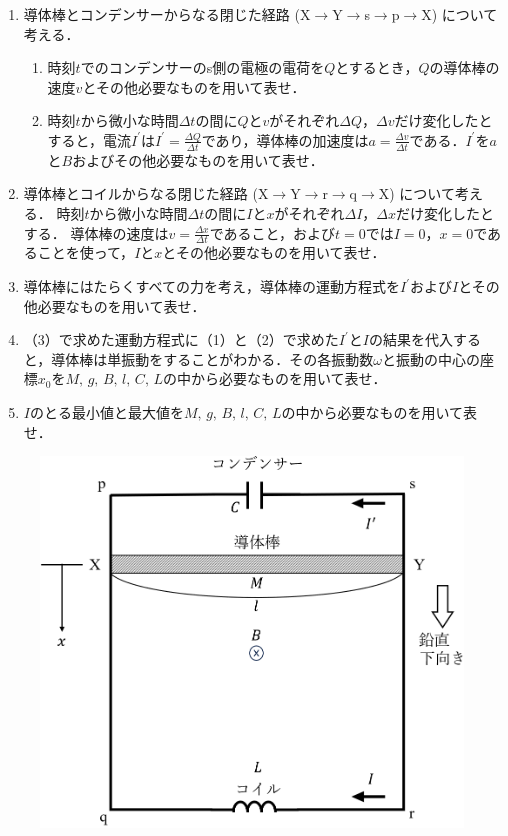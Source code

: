 \begin{enumerate}[（1）]
  \setlength{\leftskip}{-1.5zw}
  \setlength{\itemindent}{1zw}\setlength{\labelsep}{0.5zw}
  \setlength{\labelwidth}{1zw}\setlength{\leftmargin}{1zw}
  \setlength{\itemsep}{0.5\baselineskip}
  \item 導体棒とコンデンサーからなる閉じた経路
  (X$\rightarrow$Y$\rightarrow$s$\rightarrow$p$\rightarrow$X)
  について考える．
  \begin{enumerate}[（a）]
    \setlength{\leftskip}{-3zw}
    \setlength{\itemindent}{1zw}\setlength{\labelsep}{0.5zw}
    \setlength{\labelwidth}{1zw}\setlength{\leftmargin}{1zw}
    \item 時刻$t$でのコンデンサーのs側の電極の電荷を$Q$とするとき，$Q$の導体棒の速度$v$とその他必要なものを用いて表せ．
    \item 時刻$t$から微小な時間$\varDelta t$の間に$Q$と$v$がそれぞれ$\varDelta Q$，$\varDelta v$だけ変化したとすると，電流$I^\prime$は$I^\prime =\tfrac{\Delta Q}{\Delta t}$であり，導体棒の加速度は$a=\tfrac{\Delta v}{\Delta t}$である．$I^\prime$を$a$と$B$およびその他必要なものを用いて表せ．
  \end{enumerate}
  \item 導体棒とコイルからなる閉じた経路
  (X$\rightarrow$Y$\rightarrow$r$\rightarrow$q$\rightarrow$X)
  について考える．
  時刻$t$から微小な時間$\Delta t$の間に$I$と$x$がそれぞれ$\Delta I$，$\Delta x$だけ変化したとする．
  導体棒の速度は$v=\tfrac{\Delta x}{\Delta t}$であること，および$t=0$では$I=0$，$x=0$であることを使って，$I$と$x$とその他必要なものを用いて表せ．
  \item 導体棒にはたらくすべての力を考え，導体棒の運動方程式を$I^\prime$および$I$とその他必要なものを用いて表せ．
  \item （3）で求めた運動方程式に（1）と（2）で求めた$I^\prime$と$I$の結果を代入すると，導体棒は単振動をすることがわかる．その各振動数$\omega$と振動の中心の座標$x_0$を$M,\,g,\,B,\,l,\,C,\,L$の中から必要なものを用いて表せ．
  \item $I$のとる最小値と最大値を$M,\,g,\,B,\,l,\,C,\,L$の中から必要なものを用いて表せ．
\end{enumerate}

\begin{figure}[H]
  \centering
  \includegraphics[width=.5\columnwidth]{../graphs/jumon_134.png}
  \caption{}
  \label{fig:j134}
\end{figure}

